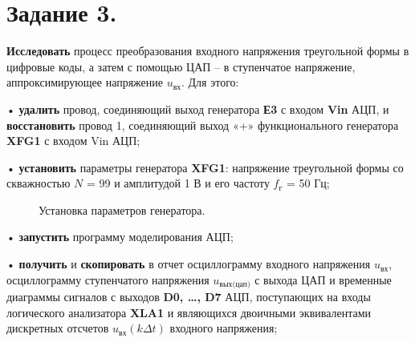 \documentclass[spec, och, otchet, hidelinks]{SCWorks}
\begin{document}
\section*{Задание 3.}

\textbf{Исследовать} процесс преобразования входного напряжения треугольной формы в цифровые коды, а затем с помощью ЦАП – в ступенчатое напряжение, 
аппроксимирующее напряжение $u_\text{вх}$. Для этого:

• \textbf{удалить} провод, соединяющий выход генератора \textbf{Е3} с входом \textbf{Vin} АЦП, и \textbf{восстановить} провод 1, соединяющий выход «+» 
функционального генератора \textbf{XFG1} с входом Vin АЦП;

• \textbf{установить} параметры генератора \textbf{XFG1}: напряжение треугольной формы со скважностью $N$ = 99 и амплитудой 1 В и его частоту 
$f_\text{г}$ = 50 Гц;

\begin{figure}[h]
	\caption{Установка параметров генератора.}
\end{figure}

• \textbf{запустить} программу моделирования АЦП;

\newpage

• \textbf{получить} и \textbf{скопировать} в отчет осциллограмму входного напряжения $u_\text{вх}$, осциллограмму ступенчатого напряжения 
$u_\text{вых(цап)}$ с выхода ЦАП и временные диаграммы сигналов с выходов \textbf{D0, \dots, D7} АЦП, поступающих на входы логического анализатора 
\textbf{XLA1} и являющихся двоичными эквивалентами дискретных отсчетов $ u_\text{вх} (k \Delta t) $ входного напряжения; 
\end{document}
